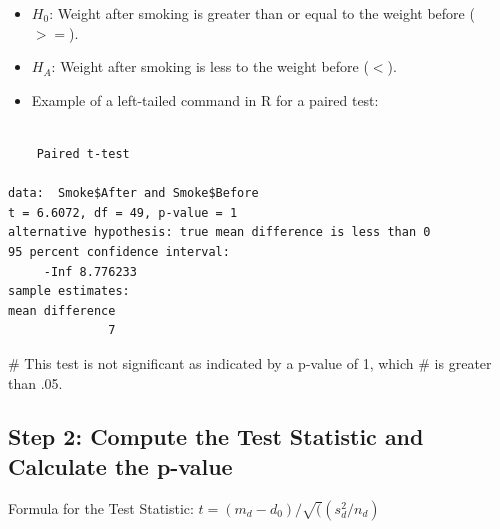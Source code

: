 \documentclass[
  letterpaper,
  DIV=11,
  numbers=noendperiod]{scrreprt}
\newenvironment{Shaded}{\begin{snugshade}}{\end{snugshade}}
\newcommand{\AttributeTok}[1]{\textcolor[rgb]{0.40,0.45,0.13}{#1}}
\newcommand{\CommentTok}[1]{\textcolor[rgb]{0.37,0.37,0.37}{#1}}
\newcommand{\ConstantTok}[1]{\textcolor[rgb]{0.56,0.35,0.01}{#1}}
\newcommand{\FunctionTok}[1]{\textcolor[rgb]{0.28,0.35,0.67}{#1}}
\newcommand{\NormalTok}[1]{\textcolor[rgb]{0.00,0.23,0.31}{#1}}
\newcommand{\SpecialCharTok}[1]{\textcolor[rgb]{0.37,0.37,0.37}{#1}}
\newcommand{\StringTok}[1]{\textcolor[rgb]{0.13,0.47,0.30}{#1}}
\providecommand{\tightlist}{%
  \setlength{\itemsep}{0pt}\setlength{\parskip}{0pt}}\usepackage{longtable,booktabs,array}
\begin{document}
\begin{itemize}
  \begin{itemize}
  \tightlist
  \item
    \(H_0\): Weight after smoking is greater than or equal to the weight
    before (\(>=\)).
  \item
    \(H_A\): Weight after smoking is less to the weight before (\(<\)).
  \item
    Example of a left-tailed command in R for a paired test:
  \end{itemize}

\begin{Shaded}
\end{Shaded}

\begin{verbatim}

    Paired t-test

data:  Smoke$After and Smoke$Before
t = 6.6072, df = 49, p-value = 1
alternative hypothesis: true mean difference is less than 0
95 percent confidence interval:
     -Inf 8.776233
sample estimates:
mean difference 
              7 
\end{verbatim}

\begin{Shaded}
\begin{Highlighting}[]
\CommentTok{\# This test is not significant as indicated by a p{-}value of 1, which}
\CommentTok{\# is greater than .05.}
\end{Highlighting}
\end{Shaded}
\end{itemize}

\subsection{Step 2: Compute the Test Statistic and Calculate the
p-value}\label{step-2-compute-the-test-statistic-and-calculate-the-p-value-1}

Formula for the Test Statistic: \(t = (m_d-d_0)/\sqrt((s^2_d/n_d)\)
\end{document}
